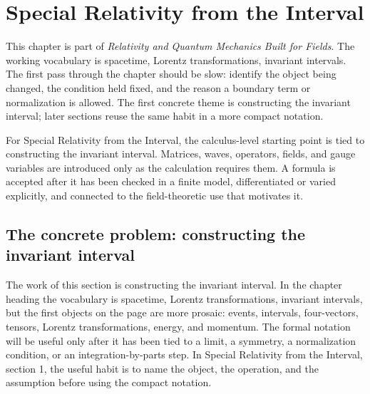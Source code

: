 \chapter{Special Relativity from the Interval}


This chapter is part of \emph{Relativity and Quantum Mechanics Built for Fields}.  The working vocabulary is spacetime, Lorentz transformations, invariant intervals.  The first pass through the chapter should be slow: identify the object being changed, the condition held fixed, and the reason a boundary term or normalization is allowed.  The first concrete theme is constructing the invariant interval; later sections reuse the same habit in a more compact notation.

For Special Relativity from the Interval, the calculus-level starting point is tied to constructing the invariant interval.  Matrices, waves, operators, fields, and gauge variables are introduced only as the calculation requires them.  A formula is accepted after it has been checked in a finite model, differentiated or varied explicitly, and connected to the field-theoretic use that motivates it.

\section{The concrete problem: constructing the invariant interval}













The work of this section is constructing the invariant interval.  In the chapter heading the vocabulary is spacetime, Lorentz transformations, invariant intervals, but the first objects on the page are more prosaic: events, intervals, four-vectors, tensors, Lorentz transformations, energy, and momentum.  The formal notation will be useful only after it has been tied to a limit, a symmetry, a normalization condition, or an integration-by-parts step.  In Special Relativity from the Interval, section 1, the useful habit is to name the object, the operation, and the assumption before using the compact notation.

